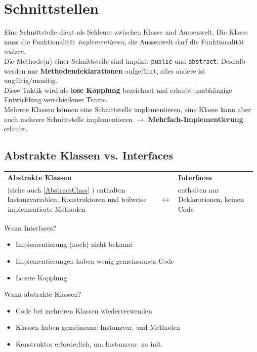 \section{Schnittstellen}
Eine Schnittstelle dient als Schleuse zwischen Klasse und Aussenwelt. Die Klasse muss die Funktionalität \textit{implementieren},
die Aussenwelt darf die Funktionalität \textit{nutzen}.\\
Die Methode(n) einer Schnittstelle sind implizit \verb|public| und \verb|abstract|. Deshalb werden nur \textbf{Methodendeklarationen} aufgeführt,
alles andere ist ungültig/unnötig.\\

Diese Taktik wird als \textbf{lose Kopplung} bezeichnet und erlaubt unabhängige Entwicklung verschiedener Teams.\\

Mehrere Klassen können eine Schnittstelle implementieren, eine Klasse kann aber auch mehrere Schnittstelle implementieren $\rightarrow$
\textbf{Mehrfach-Implementierung} erlaubt.

\subsection{Abstrakte Klassen vs. Interfaces}
\begin{tabularx}{\linewidth}{|X c X|} \hline
    \textbf{Abstrakte Klassen} & & \textbf{Interfaces} \\
    (siehe auch \ref{AbstractClass} ) enthalten Instanzvariablen, Konstruktoren und teilweise implementierte Methoden & $\longleftrightarrow $ & enthalten nur Deklarationen, keinen Code \\
    \hline
\end{tabularx}

Wann Interfaces?
\begin{itemize}
    \itemsep0em
    \item Implementierung (noch) nicht bekannt
    \item Implementierungen haben wenig gemeinsamen Code
    \item Losere Kopplung
\end{itemize}

Wann abstrakte Klassen?
\begin{itemize}
    \itemsep0em
    \item Code bei mehreren Klassen wiederverwenden
    \item Klassen haben gemeinsame Instanzvar. und Methoden
    \item Konstruktor erforderlich, um Instanzvar. zu init.
\end{itemize}

